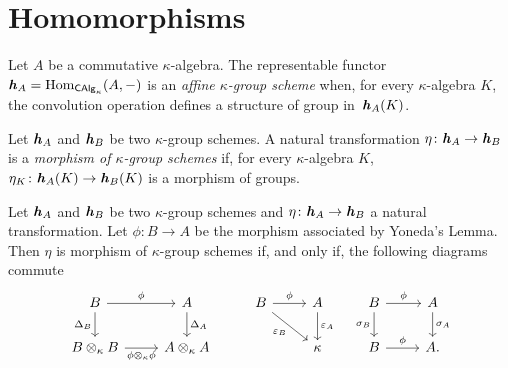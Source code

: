 \section{Homomorphisms}

\begin{defn}\label{defn:k-group-scheme}
    Let $A$ be a commutative $\kappa$-algebra. The representable functor $\textrm{\boldmath$\mathit h$}_A={\rm Hom}_{\mathsf{CAlg}_\kappa}(A,-)$ is an \textsl{affine $\kappa$-group scheme} when, for every $\kappa$-algebra $K$, the convolution operation defines a structure of group in~$\textrm{\boldmath$\mathit h$}_A(K)$.
\end{defn}

\begin{defn}
    Let $\textrm{\boldmath$\mathit h$}_A$ and $\textrm{\boldmath$\mathit h$}_B$ be two $\kappa$-group schemes. A natural transformation $\eta\colon\textrm{\boldmath$\mathit h$}_A\to\textrm{\boldmath$\mathit h$}_B$ is a \textsl{morphism of $\kappa$-group schemes} if, for every $\kappa$-algebra $K$, $\eta_K\colon\textrm{\boldmath$\mathit h$}_A(K)\to\textrm{\boldmath$\mathit h$}_B(K)$ is a morphism of groups.
\end{defn}

\begin{thm}\label{thm:k-group-scheme-equivalence}
    Let $\textrm{\boldmath$\mathit h$}_A$ and $\textrm{\boldmath$\mathit h$}_B$ be two $\kappa$-group schemes and  $\eta\colon\textrm{\boldmath$\mathit h$}_A\to\textrm{\boldmath$\mathit h$}_B$ a natural transformation. Let $\phi\colon B\to A$ be the morphism associated by Yoneda's Lemma. Then $\eta$ is morphism of $\kappa$-group schemes if, and only if, the following diagrams commute
    $$
        \begin{tikzcd}
            B
                    \arrow[r,"\phi"]
                    \arrow[d,"\Delta_B"']
                &A
                    \arrow[d,"\Delta_A"]
                &B
                    \arrow[r,"\phi"]
                    \arrow[rd,"\varepsilon_B"']
                &A
                    \arrow[d,"\varepsilon_A"]
                &B
                    \arrow[r,"\phi"]
                    \arrow[d,"\sigma_B"']
                &A
                    \arrow[d,"\sigma_A"]\\
            B\otimes_\kappa B
                    \arrow[r,"\phi\otimes_\kappa\phi"']
                &A\otimes_\kappa A
                &&\kappa
                &B
                    \arrow[r,"\phi"]
                &A.
        \end{tikzcd}
    $$
\end{thm}

